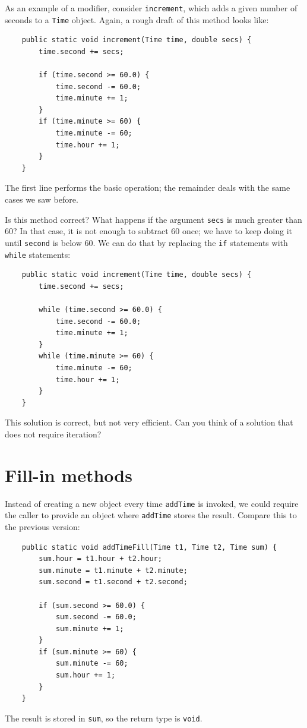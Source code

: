 As an example of a modifier, consider {\tt increment},
which adds a given number of seconds to a {\tt Time} object.
Again, a rough draft of this method looks like:

\begin{lstlisting}
    public static void increment(Time time, double secs) {
        time.second += secs;

        if (time.second >= 60.0) {
            time.second -= 60.0;
            time.minute += 1;
        }
        if (time.minute >= 60) {
            time.minute -= 60;
            time.hour += 1;
        }
    }
\end{lstlisting}
%
The first line performs the basic operation; the remainder
deals with the same cases we saw before.

Is this method correct?  What happens if the argument {\tt secs}
is much greater than 60?  In that case, it is not enough to
subtract 60 once; we have to keep doing it until {\tt second}
is below 60.  We can do that by replacing the {\tt if}
statements with {\tt while} statements:

\begin{lstlisting}
    public static void increment(Time time, double secs) {
        time.second += secs;

        while (time.second >= 60.0) {
            time.second -= 60.0;
            time.minute += 1;
        }
        while (time.minute >= 60) {
            time.minute -= 60;
            time.hour += 1;
        }
    }
\end{lstlisting}
%
This solution is correct, but not very efficient.
Can you think of a solution that does not require iteration?


\section{Fill-in methods}

Instead of creating a new object every time {\tt addTime} is
invoked, we could require the caller to provide an
object where {\tt addTime} stores the result.  Compare
this to the previous version:

\begin{lstlisting}
    public static void addTimeFill(Time t1, Time t2, Time sum) {
        sum.hour = t1.hour + t2.hour;
        sum.minute = t1.minute + t2.minute;
        sum.second = t1.second + t2.second;

        if (sum.second >= 60.0) {
            sum.second -= 60.0;
            sum.minute += 1;
        }
        if (sum.minute >= 60) {
            sum.minute -= 60;
            sum.hour += 1;
        }
    }
\end{lstlisting}
%
The result is stored in {\tt sum}, so the return type is {\tt void}.

